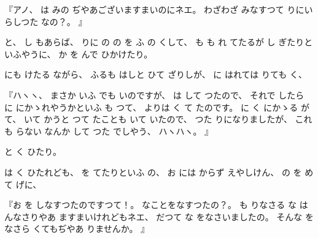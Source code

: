 『アノ、
%
は
みの
ぢやあございますまいのにネエ。
%
わざわざ
みなすつて
りにいらしつた
なの？。
』

と、
%
し
もあらば、
%
りに
の
の
を
ふ
の
くして、
%
も
も
れ
てたるが
し
ぎたりといふやうに、
%
か
を
んで
ひかけたり。

にも
けたる
ながら、
%
ふるも
はしと
ひて
ざりしが、
%
に
はれては
りても
く、

『ハヽヽ、
%
まさか
いふ
でも
いのですが、
%
は
して
つたので、
%
それで
したら
に
にかゝれやうかといふ
も
つて、
%
よりは
く
て
たのです。
%
に
く
にかゝる
が
て、
%
いて
かうと
つて
たことも
いて
いたので、
%
つた
りになりましたが、
%
これも
らない
なんか
して
つた
でしやう、
%
ハヽハヽ。%
』

と
く
ひたり。

は
く
ひたれども、
%
を
てたりといふ
の、
%
お
には
からず
えやしけん、
%
の
を
めて
げに、

『お
を
しなすつたのですつて！。
%
なことをなすつたの？。
%
も
りなさる
な
は
んなさりやあ
ますまいけれどもネエ、
%
だつて
な
をなさいましたの。
%
そんな
をなさら
くてもぢやあ
りませんか。
』

